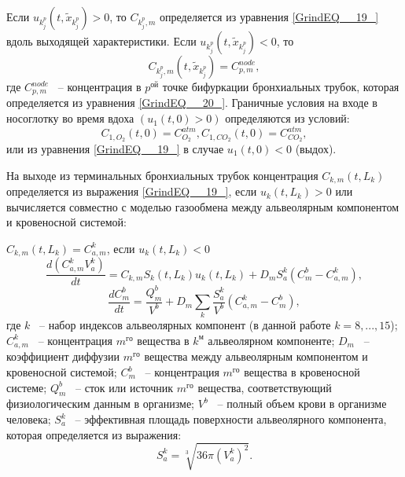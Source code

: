 Если $u_{k_{j}^{p} } \left(t,\tilde{x}_{k_{j}^{p} } \right)>0$, то $C_{k_{j}^{p} ,m} $ определяется из уравнения \eqref{GrindEQ__19_} вдоль выходящей характеристики. Если $u_{k_{j}^{p} } \left(t,\tilde{x}_{k_{j}^{p} } \right)<0$, то 
\begin{equation}  
C_{k_{j}^{p} ,m} \left(t,\tilde{x}_{k_{j}^{p} } \right)=C_{p,m}^{node} ,  
\end{equation} 
где $C_{p,m}^{node} $ ~-- концентрация в $p^{ой} $ точке бифуркации бронхиальных трубок, которая определяется из уравнения \eqref{GrindEQ__20_}. Граничные условия на входе в носоглотку во время вдоха $\left(u_{1} \left(t,0\right)>0\right)$ определяются из условий: 
\begin{equation} \label{GrindEQ__22_} 
C_{1,O_{2} } \left(t,0\right)=C_{O_{2} }^{atm} , C_{1,CO_{2} } \left(t,0\right)=C_{CO_{2} }^{atm} ,  
\end{equation} 
или из уравнения \eqref{GrindEQ__19_} в случае $u_{1} \left(t,0\right)<0$ (выдох).

На выходе из терминальных бронхиальных трубок концентрация $C_{k,m} \left(t,L_{k} \right)$ определяется из выражения \eqref{GrindEQ__19_}, если $u_{k} \left(t,L_{k} \right)>0$ или вычисляется совместно с моделью газообмена между альвеолярным компонентом и кровеносной системой:

 $C_{k,m} \left(t,L_{k} \right)=C_{a,m}^{k} $, если $u_{k} \left(t,L_{k} \right)<0$
\begin{equation} \label{GrindEQ__24_} 
\frac{d\left(C_{a,m}^{k} V_{a}^{k} \right)}{dt} =C_{k,m} S_{k} \left(t,L_{k} \right)u_{k} \left(t,L_{k} \right)+D_{m} S_{a}^{k} \left(C_{m}^{b} -C_{a,m}^{k} \right),  
\end{equation} 
\begin{equation} \label{GrindEQ__25_} 
\frac{dC_{m}^{b} }{dt} =\frac{Q_{m}^{b} }{V^{b} } +D_{m} \sum _{k}\frac{S_{a}^{k} }{V^{b} } \left(C_{a,m}^{k} -C_{m}^{b} \right) ,  
\end{equation} 
где $k$ ~-- набор индексов альвеолярных компонент (в данной работе $k=8,...,15$); $C_{a,m}^{k} $ ~-- концентрация $m^{го} $  вещества в $k^{м} $ альвеолярном компоненте; $D_{m} $ ~-- коэффициент диффузии $m^{го} $ вещества между альвеолярным компонентом и кровеносной системой; $C_{m}^{b} $  ~-- концентрация $m^{го} $ вещества в кровеносной системе; $Q_{m}^{b} $ ~-- сток или источник $m^{го} $ вещества, соответствующий физиологическим данным в организме; $V^{b} $ ~-- полный объем крови в организме человека; $S_{a}^{k} $ ~-- эффективная площадь поверхности альвеолярного компонента, которая определяется из выражения:
\begin{equation} \label{GrindEQ__26_} 
S_{a}^{k} =\sqrt[{3}]{36\pi \left(V_{a}^{k} \right)^{2} } .  
\end{equation} 

